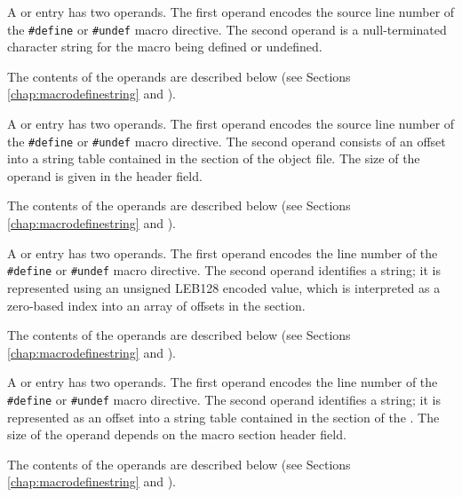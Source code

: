 \begin{enumerate}[1. ]

\itembfnl{\DWMACROdefineTARG{}, \DWMACROundefTARG{}}
A \DWMACROdefineNAME{} or \DWMACROundefNAME{} entry has two
operands. The first operand encodes the source line number 
of the \texttt{\#define} or \texttt{\#undef} macro directive.
The second operand is a null-terminated character
string for the macro being defined or undefined. 

The contents of the operands are described below (see Sections 
\ref{chap:macrodefinestring} and ).

\itembfnl{\DWMACROdefinestrpTARG{}, \DWMACROundefstrpTARG{}}
A \DWMACROdefinestrpNAME{} or \DWMACROundefstrpNAME{} 
entry has two operands.  The first operand encodes the source line number
of the \texttt{\#define} or \texttt{\#undef} macro directive. 
The second operand consists of an offset into a string table contained in
the \dotdebugstr{} section of the object file.  The size of the operand is
given in the header \HFNoffsetsizeflag{} field. 

The contents of the operands are described below (see Sections 
\ref{chap:macrodefinestring} and ).

\itembfnl{\DWMACROdefinestrxTARG{}, \DWMACROundefstrxTARG{}}
A \DWMACROdefinestrxNAME{} or \DWMACROundefstrxNAME{} entry 
has two operands.  The first operand encodes the line number 
of the \texttt{\#define} or \texttt{\#undef} macro directive.
The second operand identifies a string; it is represented using an 
unsigned LEB128 encoded value,
which is interpreted as a zero-based index into an array of offsets in the
\dotdebugstroffsets{} section. 

The contents of the operands are described below (see Sections 
\ref{chap:macrodefinestring} and ).

\itembfnl{\DWMACROdefinesupTARG{}, \DWMACROundefsupTARG{}}
A \DWMACROdefinesupNAME{} or \DWMACROundefsupNAME{} entry 
has two operands.  The first operand encodes the line number 
of the \texttt{\#define} or \texttt{\#undef} macro directive.
The second operand identifies a string; it is represented as
an offset into a string table contained in the \dotdebugstr{} 
section of the .  
The size of the operand depends on the macro section header 
\HFNoffsetsizeflag{} field.  

The contents of the operands are described below (see Sections 
\ref{chap:macrodefinestring} and ).

\end{enumerate}

